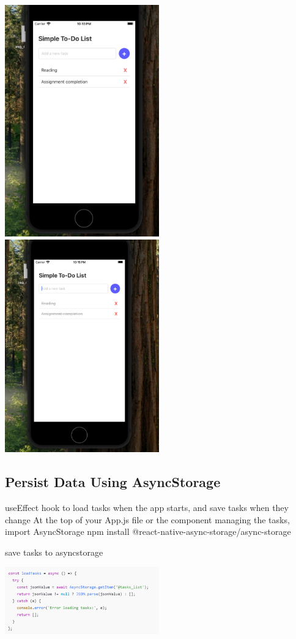 \documentclass[a4paper,12pt]{article}
\begin{document}
\includegraphics[width=0.5\textwidth]{task 1 a0.jpeg}
\includegraphics[width=0.5\textwidth]{task1 a.jpeg}

\subsection{Persist Data Using AsyncStorage }

useEffect hook to load tasks when the app starts, and save tasks when they change
At the top of your App.js file or the component managing the tasks, import AsyncStorage
npm install @react-native-async-storage/async-storage

 save tasks to asyncstorage
 
 \includegraphics[width=0.5\textwidth]{per 2.png}
\end{document}
